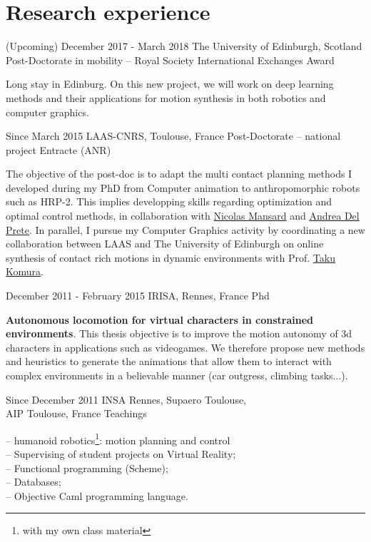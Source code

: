 \documentclass{tccv}
\begin{document}
\section{Research experience}
\begin{eventlist}
\item{(Upcoming) December 2017 - March 2018}
     {The University of Edinburgh, Scotland}
     {Post-Doctorate in mobility -- Royal Society International Exchanges Award}
     
     Long stay in Edinburg. On this new project, we will work on deep learning methods and their applications for motion synthesis
     in both robotics and computer graphics. 

\item{Since March 2015 }
     {LAAS-CNRS, Toulouse, France}
     {Post-Doctorate -- national project Entracte (ANR)}
     
     The objective of the post-doc is to adapt the multi contact planning methods I developed 
     during my PhD from Computer animation to anthropomorphic robots such as HRP-2.
     This implies developping skills regarding optimization and optimal control methods, in collaboration with \href{http://projects.laas.fr/gepetto/index.php/Members/NicolasMansard}{Nicolas Mansard} and 
     \href{https://andreadelprete.github.io/}{Andrea Del Prete}.
     In parallel, I pursue my Computer Graphics activity by coordinating a new collaboration between LAAS and The University of Edinburgh on online
     synthesis of contact rich motions in dynamic environments with Prof. \href{http://homepages.inf.ed.ac.uk/tkomura/}{Taku Komura}.

\item{December 2011 - February 2015}
     {IRISA, Rennes, France}
     {Phd}
	 
 \textbf{Autonomous locomotion for virtual characters in constrained environments}.
 This thesis objective is to improve the motion autonomy of 3d characters in applications such as videogames.
We therefore propose new methods and heuristics to generate the animations that allow them to interact with complex environments in a believable manner (car outgress, climbing tasks...).



\item{Since December 2011}
     {INSA Rennes, Supaero Toulouse,\\ AIP Toulouse, France}
     {Teachings}
     
-- humanoid robotics\footnote{with my own class material}: motion planning and control
\\-- Supervising of student projects on Virtual Reality;
\\-- Functional programming (Scheme);
\\ -- Databases;
\\ -- Objective Caml programming language.


\end{eventlist}
\end{document}
